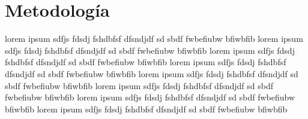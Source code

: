 \section{Metodolog\'ia}


	lorem ipsum sdfjs fdsdj fshdbfsf dfsndjdf sd sbdf fwbefiubw bfiwbfib lorem ipsum sdfjs fdsdj fshdbfsf dfsndjdf sd sbdf fwbefiubw bfiwbfib lorem ipsum sdfjs fdsdj fshdbfsf dfsndjdf sd sbdf fwbefiubw bfiwbfib lorem ipsum sdfjs fdsdj fshdbfsf dfsndjdf sd sbdf fwbefiubw bfiwbfib lorem ipsum sdfjs fdsdj fshdbfsf dfsndjdf sd sbdf fwbefiubw bfiwbfib lorem ipsum sdfjs fdsdj fshdbfsf dfsndjdf sd sbdf fwbefiubw bfiwbfib lorem ipsum sdfjs fdsdj fshdbfsf dfsndjdf sd sbdf fwbefiubw bfiwbfib lorem ipsum sdfjs fdsdj fshdbfsf dfsndjdf sd sbdf fwbefiubw bfiwbfib


	